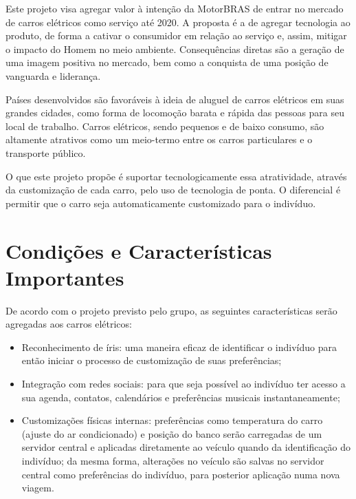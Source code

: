\documentclass[12pt,journal,compsoc]{IEEEtran}
\begin{document}
Este projeto visa agregar valor à intenção da MotorBRAS de entrar no mercado de carros elétricos como serviço até 2020. A proposta é a de agregar tecnologia ao produto, de forma a cativar o consumidor em relação ao serviço e, assim, mitigar o impacto do Homem no meio ambiente. Consequências diretas são a geração de uma imagem positiva no mercado, bem como a conquista de uma posição de vanguarda e liderança. 

Países desenvolvidos são favoráveis à ideia de aluguel de carros elétricos em suas grandes cidades, como forma de locomoção barata e rápida das pessoas para seu local de trabalho. Carros elétricos, sendo pequenos e de baixo consumo, são altamente atrativos como um meio-termo entre os carros particulares e o transporte público. 

O que este projeto propõe é suportar tecnologicamente essa atratividade, através da customização de cada carro, pelo uso de tecnologia de ponta. O diferencial é permitir que o carro seja automaticamente customizado para o indivíduo. 


\section{Condições e Características Importantes}

De acordo com o projeto previsto pelo grupo, as seguintes características serão agregadas aos carros elétricos:

\begin{itemize}

\item Reconhecimento de íris: uma maneira eficaz de identificar o indivíduo para então iniciar o processo de customização de suas preferências;

\item Integração com redes sociais: para que seja possível ao indivíduo ter acesso a sua agenda, contatos, calendários e preferências musicais instantaneamente; 

\item Customizações físicas internas: preferências como temperatura do carro (ajuste do ar condicionado) e posição do banco serão carregadas de um servidor central e aplicadas diretamente ao veículo quando da identificação do indivíduo; da mesma forma, alterações no veículo são salvas no servidor central como preferências do indivíduo, para posterior aplicação numa nova viagem.

\end{itemize}
\end{document}
